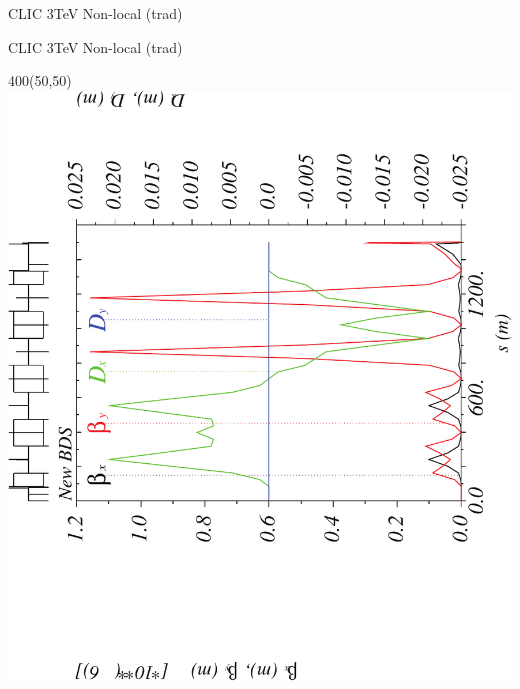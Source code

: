 \documentclass{beamer}
\begin{document}
\begin{frame}
 \color{blue}\Large CLIC 3TeV Non-local (trad)
\end{frame}
\begin{frame}{CLIC 3TeV Non-local (trad)}
  \setlength{\TPHorizModule}{1pt}
  \setlength{\TPVertModule}{1pt}
 \begin{textblock}{400}(50,50)
 \includegraphics[scale=0.4,angle=-90]{CLICtrad_etax-crop.pdf}
 \end{textblock}
\end{frame}
\end{document}
